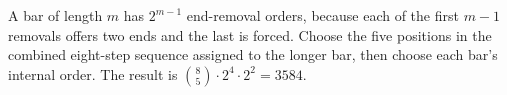A bar of length $ m $ has $ 2^{m-1}$ end-removal orders, because each of the first $ m-1 $ removals offers two ends and the last is forced. Choose the five positions in the combined eight-step sequence assigned to the longer bar, then choose each bar's internal order. The result is $\binom85\cdot2^4\cdot2^2=\boxed{3584}$.
